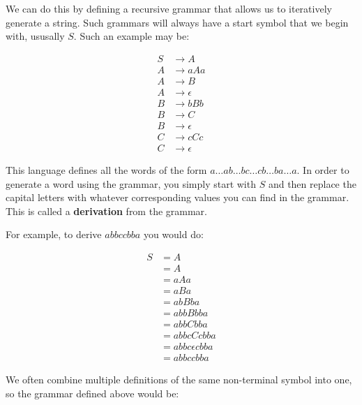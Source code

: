 We can do this by defining a recursive grammar that allows us to iteratively
generate a string. Such grammars will always have a start symbol that we begin
with, ususally $S$. Such an example may be:

\[
	\begin{split}
		S &\rightarrow A\\
		A &\rightarrow aAa\\
		A &\rightarrow B\\
		A &\rightarrow \epsilon\\
		B &\rightarrow bBb\\
		B &\rightarrow C\\
		B &\rightarrow \epsilon\\
		C &\rightarrow cCc\\
		C &\rightarrow \epsilon
	\end{split}
\]

This language defines all the words of the form $a \dots ab \dots bc \dots cb
\dots ba \dots a$. In order to generate a word using the grammar, you simply
start with $S$ and then replace the capital letters with whatever corresponding
values you can find in the grammar. This is called a {\bf derivation} from the
grammar.


For example, to derive $abbccbba$ you would do:

\[
	\begin{split}
		S &= A\\
		  &= A\\
		  &= aAa\\
		  &= aBa\\
		  &= abBba\\
		  &= abbBbba\\
		  &= abbCbba\\
		  &= abbcCcbba\\
		  &= abbc \epsilon cbba\\
		  &= abbccbba
	\end{split}	
\]

We often combine multiple definitions of the same non-terminal symbol into one,
so the grammar defined above would be:

